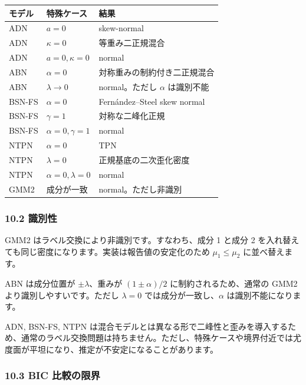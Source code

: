\documentclass[
]{article}
\begin{document}
\begin{longtable}[]{@{}lll@{}}
\toprule\noalign{}
モデル & 特殊ケース & 結果 \\
\midrule\noalign{}
\endhead
\bottomrule\noalign{}
\endlastfoot
ADN & \(a=0\) & skew-normal \\
ADN & \(\kappa=0\) & 等重み二正規混合 \\
ADN & \(a=0,\kappa=0\) & normal \\
ABN & \(\alpha=0\) & 対称重みの制約付き二正規混合 \\
ABN & \(\lambda\to0\) & normal。ただし \(\alpha\) は識別不能 \\
BSN-FS & \(\alpha=0\) & Fernández--Steel skew normal \\
BSN-FS & \(\gamma=1\) & 対称な二峰化正規 \\
BSN-FS & \(\alpha=0,\gamma=1\) & normal \\
NTPN & \(\alpha=0\) & TPN \\
NTPN & \(\lambda=0\) & 正規基底の二次歪化密度 \\
NTPN & \(\alpha=0,\lambda=0\) & normal \\
GMM2 & 成分が一致 & normal。ただし非識別 \\
\end{longtable}

\hypertarget{ux8b58ux5225ux6027}{%
\subsubsection{10.2 識別性}\label{ux8b58ux5225ux6027}}

GMM2 はラベル交換により非識別です。すなわち、成分 1 と成分 2
を入れ替えても同じ密度になります。実装は報告値の安定化のため
\(\mu_1\le\mu_2\) に並べ替えます。

ABN は成分位置が \(\pm\lambda\)、重みが \((1\pm\alpha)/2\)
に制約されるため、通常の GMM2 より識別しやすいです。ただし \(\lambda=0\)
では成分が一致し、\(\alpha\) は識別不能になります。

ADN, BSN-FS, NTPN
は混合モデルとは異なる形で二峰性と歪みを導入するため、通常のラベル交換問題は持ちません。ただし、特殊ケースや境界付近では尤度面が平坦になり、推定が不安定になることがあります。

\hypertarget{bic-ux6bd4ux8f03ux306eux9650ux754c}{%
\subsubsection{10.3 BIC
比較の限界}\label{bic-ux6bd4ux8f03ux306eux9650ux754c}}
\end{document}
